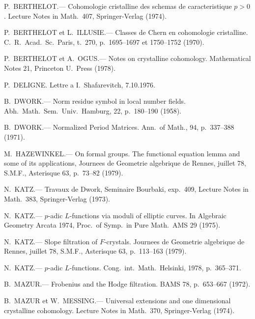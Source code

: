 \documentclass[12pt,a4paper]{article}
\theoremstyle{plain}
\theoremstyle{definition}
\theoremstyle{remark}
\begin{document}
\begin{enumerate}[label={[\arabic*]}, leftmargin=2em, itemsep=0.5ex]
\item P.\ BERTHELOT.--- Cohomologie cristalline des schemas de caracteristique $p > 0$. Lecture Notes in Math.\ 407, Springer-Verlag (1974).

\item P.\ BERTHELOT et L.\ ILLUSIE.--- Classes de Chern en cohomologie cristalline. C.\ R.\ Acad.\ Sc.\ Paris, t.\ 270, p.\ 1695--1697 et 1750--1752 (1970).

\item P.\ BERTHELOT et A.\ OGUS.--- Notes on crystalline cohomology. Mathematical Notes 21, Princeton U.\ Press (1978).

\item P.\ DELIGNE. Lettre a I.\ Shafarevitch, 7.10.1976.

\item B.\ DWORK.--- Norm residue symbol in local number fields. Abh.\ Math.\ Sem.\ Univ.\ Hamburg, 22, p.\ 180--190 (1958).

\item B.\ DWORK.--- Normalized Period Matrices. Ann.\ of Math., 94, p.\ 337--388 (1971).

\item M.\ HAZEWINKEL.--- On formal groups. The functional equation lemma and some of its applications, Journees de Geometrie algebrique de Rennes, juillet 78, S.M.F., Asterisque 63, p.\ 73--82 (1979).

\item N.\ KATZ.--- Travaux de Dwork, Seminaire Bourbaki, exp.\ 409, Lecture Notes in Math.\ 383, Springer-Verlag (1973).

\item N.\ KATZ.--- $p$-adic $L$-functions via moduli of elliptic curves. In Algebraic Geometry Arcata 1974, Proc.\ of Symp.\ in Pure Math.\ AMS 29 (1975).

\item N.\ KATZ.--- Slope filtration of $F$-crystals. Journees de Geometrie algebrique de Rennes, juillet 78, S.M.F., Asterisque 63, p.\ 113--163 (1979).

\item N.\ KATZ.--- $p$-adic $L$-functions. Cong.\ int.\ Math.\ Helsinki, 1978, p.\ 365--371.

\item B.\ MAZUR.--- Frobenius and the Hodge filtration. BAMS 78, p.\ 653--667 (1972).

\item B.\ MAZUR et W.\ MESSING.--- Universal extensions and one dimensional crystalline cohomology. Lecture Notes in Math.\ 370, Springer-Verlag (1974).


\end{enumerate}
\end{document}
